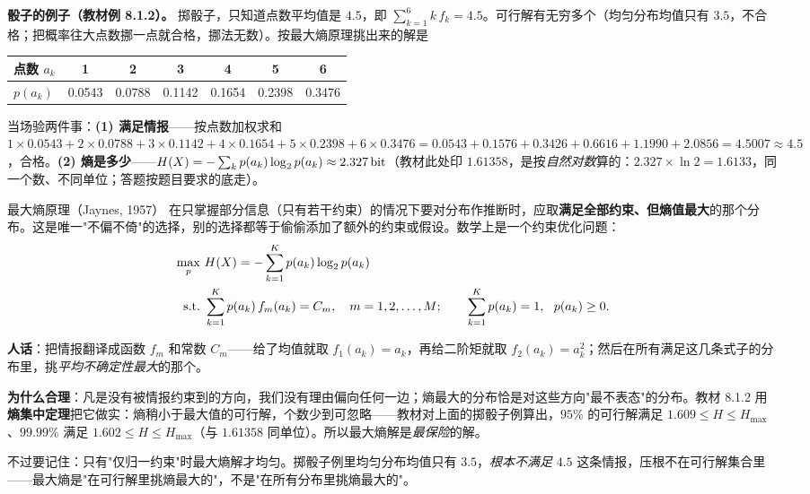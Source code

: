 \textbf{骰子的例子（教材例 8.1.2）。} 掷骰子，只知道点数平均值是 $4.5$，即 $\sum_{k=1}^{6}k\,f_k=4.5$。可行解有无穷多个（均匀分布均值只有 $3.5$，不合格；把概率往大点数挪一点就合格，挪法无数）。按最大熵原理挑出来的解是

\begin{center}\small
\begin{tabular}{lcccccc}
\toprule
点数 $a_k$ & 1 & 2 & 3 & 4 & 5 & 6 \\
\midrule
$p(a_k)$ & 0.0543 & 0.0788 & 0.1142 & 0.1654 & 0.2398 & 0.3476 \\
\bottomrule
\end{tabular}
\end{center}

当场验两件事：\textbf{(1) 满足情报}——按点数加权求和
$1\times0.0543+2\times0.0788+3\times0.1142+4\times0.1654+5\times0.2398+6\times0.3476
=0.0543+0.1576+0.3426+0.6616+1.1990+2.0856=4.5007\approx4.5$，合格。\textbf{(2) 熵是多少}——$H\!\left(X\right)=-\sum_kp\!\left(a_k\right)\log_{2}p\!\left(a_k\right)\approx2.327\,\text{bit}$（教材此处印 $1.61358$，是按\emph{自然对数}算的：$2.327\times\ln 2=1.6133$，同一个数、不同单位；答题按题目要求的底走）。

\begin{defbox}{最大熵原理（Jaynes, 1957）}
在只掌握部分信息（只有若干约束）的情况下要对分布作推断时，应取\textbf{满足全部约束、但熵值最大}的那个分布。这是唯一"不偏不倚"的选择，别的选择都等于偷偷添加了额外的约束或假设。数学上是一个约束优化问题：
\begin{align*}
\max_{p}\ &H\!\left(X\right)=-\sum_{k=1}^{K}p\!\left(a_k\right)\log_{2}p\!\left(a_k\right)\\
\text{s.t.}\ &\sum_{k=1}^{K}p\!\left(a_k\right)f_m(a_k)=C_m,\quad m=1,2,\dots,M;
\qquad \sum_{k=1}^{K}p\!\left(a_k\right)=1,\ \ p\!\left(a_k\right)\ge 0 .
\end{align*}
\end{defbox}

\textbf{人话}：把情报翻译成函数 $f_m$ 和常数 $C_m$——给了均值就取 $f_1(a_k)=a_k$，再给二阶矩就取 $f_2(a_k)=a_k^2$；然后在所有满足这几条式子的分布里，挑\emph{平均不确定性最大}的那个。

\textbf{为什么合理}：凡是没有被情报约束到的方向，我们没有理由偏向任何一边；熵最大的分布恰是对这些方向"最不表态"的分布。教材 8.1.2 用\textbf{熵集中定理}把它做实：熵稍小于最大值的可行解，个数少到可忽略——教材对上面的掷骰子例算出，$95\%$ 的可行解满足 $1.609\le H\le H_{\max}$、$99.99\%$ 满足 $1.602\le H\le H_{\max}$（与 $1.61358$ 同单位）。所以最大熵解是\emph{最保险}的解。

不过要记住：只有"仅归一约束"时最大熵解才均匀。掷骰子例里均匀分布均值只有 $3.5$，\emph{根本不满足} $4.5$ 这条情报，压根不在可行解集合里——最大熵是"在可行解里挑熵最大的"，不是"在所有分布里挑熵最大的"。

